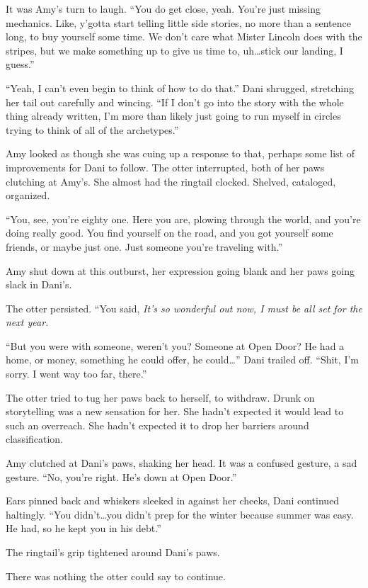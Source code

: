 It was Amy's turn to laugh. ``You do get close, yeah. You're just missing mechanics. Like, y'gotta start telling little side stories, no more than a sentence long, to buy yourself some time. We don't care what Mister Lincoln does with the stripes, but we make something up to give us time to, uh\ldots{}stick our landing, I guess.''

``Yeah, I can't even begin to think of how to do that.'' Dani shrugged, stretching her tail out carefully and wincing. ``If I don't go into the story with the whole thing already written, I'm more than likely just going to run myself in circles trying to think of all of the archetypes.''

Amy looked as though she was cuing up a response to that, perhaps some list of improvements for Dani to follow. The otter interrupted, both of her paws clutching at Amy's. She almost had the ringtail clocked. Shelved, cataloged, organized.

``You, see, you're eighty one. Here you are, plowing through the world, and you're doing really good. You find yourself on the road, and you got yourself some friends, or maybe just one. Just someone you're traveling with.''

Amy shut down at this outburst, her expression going blank and her paws going slack in Dani's.

The otter persisted. ``You said, \emph{It's so wonderful out now, I must be all set for the next year.}

``But you were with someone, weren't you? Someone at Open Door? He had a home, or money, something he could offer, he could\ldots{}'' Dani trailed off. ``Shit, I'm sorry. I went way too far, there.''

The otter tried to tug her paws back to herself, to withdraw. Drunk on storytelling was a new sensation for her. She hadn't expected it would lead to such an overreach. She hadn't expected it to drop her barriers around classification.

Amy clutched at Dani's paws, shaking her head. It was a confused gesture, a sad gesture. ``No, you're right. He's down at Open Door.''

Ears pinned back and whiskers sleeked in against her cheeks, Dani continued haltingly. ``You didn't\ldots{}you didn't prep for the winter because summer was easy. He had, so he kept you in his debt.''

The ringtail's grip tightened around Dani's paws.

There was nothing the otter could say to continue.

